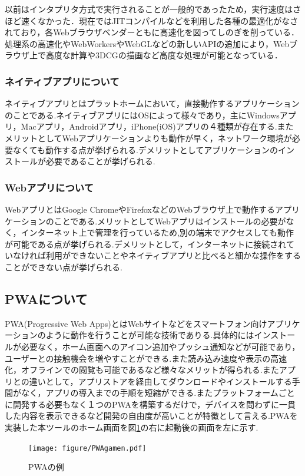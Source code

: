 \documentclass[a4j,12pt]{jarticle}
\begin{document}
以前はインタプリタ方式で実行されることが一般的であったため，実行速度はさほど速くなかった．現在ではJITコンパイルなどを利用した各種の最適化がなされており，各Webブラウザベンダーともに高速化を図ってしのぎを削っている．
処理系の高速化やWebWorkersやWebGLなどの新しいAPIの追加により，Webブラウザ上で高度な計算や3DCGの描画など高度な処理が可能となっている\cite{ren9}．

\subsubsection{ネイティブアプリについて}
ネイティブアプリとはプラットホームにおいて，直接動作するアプリケーションのことである.ネイティブアプリにはOSによって様々であり，主にWindowsアプリ，Macアプリ，Androidアプリ，iPhone(iOS)アプリの４種類が存在する.またメリットとしてWebアプリケーションよりも動作が早く，ネットワーク環境が必要なくても動作する点が挙げられる.デメリットとしてアプリケーションのインストールが必要であることが挙げられる.


\subsubsection{Webアプリについて}
WebアプリとはGoogle ChromeやFirefoxなどのWebブラウザ上で動作するアプリケーションのことである.メリットとしてWebアプリはインストールの必要がなく，インターネット上で管理を行っているため,別の端末でアクセスしても動作が可能である点が挙げられる.デメリットとして，インターネットに接続されていなければ利用ができないことやネイティブアプリと比べると細かな操作をすることができない点が挙げられる.


\subsection{PWAについて}
PWA(Progressive Web Apps)とはWebサイトなどをスマートフォン向けアプリケーションのように動作を行うことが可能な技術でありる.具体的にはインストールが必要なく，ホーム画面へのアイコン追加やプッシュ通知などが可能であり，ユーザーとの接触機会を増やすことができる.また読み込み速度や表示の高速化，オフラインでの閲覧も可能であるなど様々なメリットが得られる.またアプリとの違いとして，アプリストアを経由してダウンロードやインストールする手間がなく，アプリの導入までの手順を短縮ができる.またプラットフォームごとに開発する必要もなく１つのPWAを構築するだけで，デバイスを問わずに一貫した内容を表示できるなど開発の自由度が高いことが特徴として言える\cite{ren6}.PWAを実装した本ツールのホーム画面を図\ref{fig:f}の右に起動後の画面を左に示す.
\begin{figure}[h]
\begin{center}
 \texttt{[image: figure/PWAgamen.pdf]}
\end{center}
 \caption{PWAの例}
 \label{fig:f}
\end{figure}
\newpage
\end{document}
